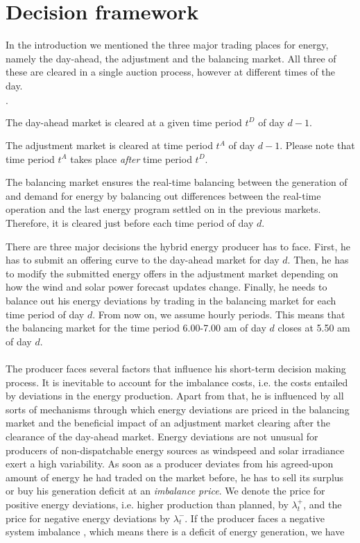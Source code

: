 \section{Decision framework}
In the introduction we mentioned the three major trading places for energy, namely the day-ahead, the adjustment and the balancing market. All three of these are cleared in a single auction process, however at different times of the day. 

\begin{list}{$\cdot$}{}
	\item The day-ahead market is cleared at a given time period $t^D$ of day $d-1$.
	\item The adjustment market is cleared at time period $t^{A}$ of day $d-1$. Please note that time period $t^{A}$ takes place \textit{after} time period $t^{D}$.
	\item The balancing market ensures the real-time balancing between the generation of and demand for energy by balancing out differences between the real-time operation and the last energy program settled on in the previous markets. Therefore, it is cleared just before each time period of day $d$. 
\end{list}
There are three major decisions the hybrid energy producer has to face. First, he has to submit an offering curve to the day-ahead market for day $d$.  Then, he has to modify the submitted energy offers in the adjustment market depending on how the wind and solar power forecast updates change.  Finally, he needs to balance out his energy deviations by trading in the balancing market for each time period of day $d$. From now on, we assume hourly periods. This means that the balancing market for the time period 6.00-7.00 am of day $d$ closes at 5.50 am of day $d$. 
\\
\\ The producer faces several factors that influence his short-term decision making process. It is inevitable to account for the imbalance costs, i.e. the costs entailed by deviations in the energy production. Apart from that, he is influenced by all sorts of mechanisms through which energy deviations are priced in the balancing market and the beneficial impact of an adjustment market clearing after the clearance of the day-ahead market. Energy deviations are not unusual for producers of non-dispatchable energy sources as windspeed and solar irradiance exert a high variability. As soon as a producer deviates from his agreed-upon amount of energy he had traded on the market before, he has to sell its surplus or buy his generation deficit at an \textit{imbalance price}. We denote the price for positive energy deviations, i.e. higher production than planned, by $\lambda_{t}^{+}$, and the price for negative energy deviations by $\lambda_{t}^{-}$. If the producer faces a negative system imbalance , which means there is a deficit of energy generation, we have
